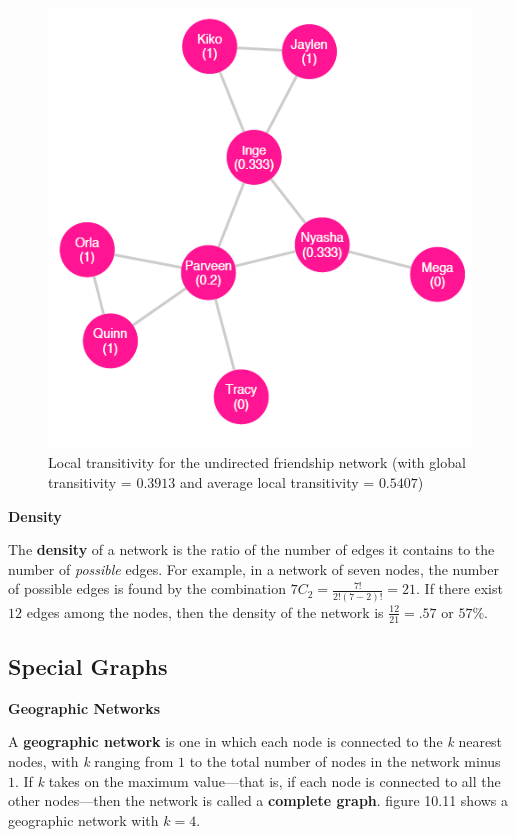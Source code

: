 \documentclass{book}
\begin{document}
\begin{figure}
\centering
\includegraphics{images/social-networks/11-10.png}
\caption{Local transitivity for the undirected friendship network (with global
transitivity = \(0.3913\) and average local transitivity = \(0.5407\))}
\end{figure}

\textbf{Density}

The \textbf{density} of a network is the ratio of the number of edges it
contains to the number of \emph{possible} edges. For example, in a network of
seven nodes, the number of possible edges is found by the combination
\(7C_2 = \frac{7!}{2!(7 - 2)!} = 21\). If there exist \(12\) edges among the
nodes, then the density of the network is \(\frac{12}{21} = .57\) or \(57\%\).

\hypertarget{special-graphs}{%
\subsection{Special Graphs}\label{special-graphs}}

\textbf{Geographic Networks}

A \textbf{geographic network} is one in which each node is connected to the
\emph{k} nearest nodes, with \emph{k} ranging from \(1\) to the total number
of nodes in the network minus \(1\). If \emph{k} takes on the maximum
value---that is, if each node is connected to all the other nodes---then the
network is called a \textbf{complete graph}. figure 10.11 shows a geographic
network with \(k = 4\).
\end{document}
